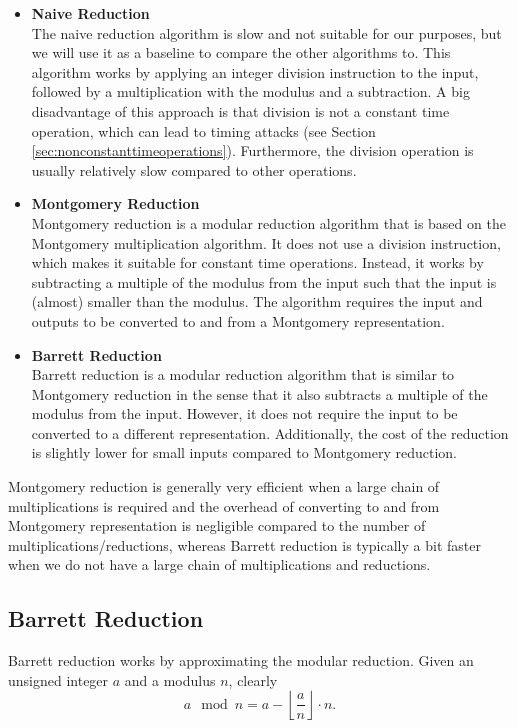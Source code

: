 \documentclass[11pt,a4paper]{report}
\theoremstyle{definition}
\begin{document}
\begin{itemize}
  \item \textbf{Naive Reduction}\\
  The naive reduction algorithm is slow and not suitable for our purposes, but we will use it as a baseline to compare the other algorithms to. This algorithm works by applying an integer division instruction to the input, followed by a multiplication with the modulus and a subtraction. A big disadvantage of this approach is that division is not a constant time operation, which can lead to timing attacks (see Section \ref{sec:nonconstanttimeoperations}). Furthermore, the division operation is usually relatively slow compared to other operations.
  \item \textbf{Montgomery Reduction}\\
  Montgomery reduction \cite{montgomery1985modular} is a modular reduction algorithm that is based on the Montgomery multiplication algorithm. It does not use a division instruction, which makes it suitable for constant time operations. Instead, it works by subtracting a multiple of the modulus from the input such that the input is (almost) smaller than the modulus. The algorithm requires the input and outputs to be converted to and from a Montgomery representation.
  \item \textbf{Barrett Reduction}\\
  Barrett reduction\cite{barrett1986implementing} is a modular reduction algorithm that is similar to Montgomery reduction in the sense that it also subtracts a multiple of the modulus from the input. However, it does not require the input to be converted to a different representation. Additionally, the cost of the reduction is slightly lower for small inputs compared to Montgomery reduction.
\end{itemize}

Montgomery reduction is generally very efficient when a large chain of multiplications is required and the overhead of converting to and from Montgomery representation is negligible compared to the number of multiplications/reductions, whereas Barrett reduction is typically a bit faster when we do not have a large chain of multiplications and reductions.

\subsection{Barrett Reduction}
\label{sec:barrettreduction}
Barrett reduction works by approximating the modular reduction. Given an unsigned integer $a$ and a modulus $n$, clearly
\[
  a \mod n = a - \left\lfloor \frac{a}{n} \right\rfloor \cdot n.
\]
\end{document}
